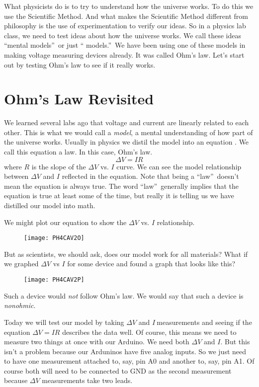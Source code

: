 What physicists do is to try to understand how the universe works. To do
this we use the Scientific Method. And what makes the Scientific Method
different from philosophy is the use of experimentation to verify our ideas.
So in a physics lab class, we need to test ideas about how the universe
works. We call these ideas \textquotedblleft mental
models\textquotedblright\ or just \textquotedblleft
models.\textquotedblright\ We have been using one of these models in making
voltage measuring devices already. It was called Ohm's law. Let's start out
by testing Ohm's law to see if it really works.

\section{Ohm's Law Revisited}

We learned several labs ago that voltage and current are linearly related to
each other. This is what we would call a \emph{model}, a mental
understanding of how part of the universe works. Usually in physics we
distil the model into an equation . We call this equation a law. In this
case, Ohm's law. 
\begin{equation*}
\Delta V=IR
\end{equation*}%
where $R$ is the slope of the $\Delta V$ vs. $I$ curve. We can see the model
relationship between $\Delta V$ and $I$ reflected in the equation. Note that
being a \textquotedblleft law\textquotedblright\ doesn't mean the equation
is always true. The word \textquotedblleft law\textquotedblright\ generally
implies that the equation is true at least some of the time, but really it
is telling us we have distilled our model into math.

We might plot our equation to show the $\Delta V$ vs. $I$ relationship.

\begin{figure}[h!]
\texttt{[image: PH4CAV2O]}
\end{figure}But as scientists, we should ask,
does our model work for all materials? What if we graphed $\Delta V$ vs $I$
for some device and found a graph that looks like this?\begin{figure}[h!]
\texttt{[image: PH4CAV2P]}
\end{figure}Such a device would \emph{not}
follow Ohm's law. We would say that such a device is \emph{nonohmic}.

Today we will test our model by taking $\Delta V$ and $I\ $measurements and
seeing if the equation $\Delta V=IR$ describes the data well. Of course,
this means we need to measure two things at once with our Arduino. We need
both $\Delta V$ and $I.$ But this isn't a problem because our Arduninos have
five analog inputs. So we just need to have one measurement attached to,
say, pin A0 and another to, say, pin A1. Of course both will need to be
connected to GND as the second measurement because $\Delta V$ measurements
take two leads.

